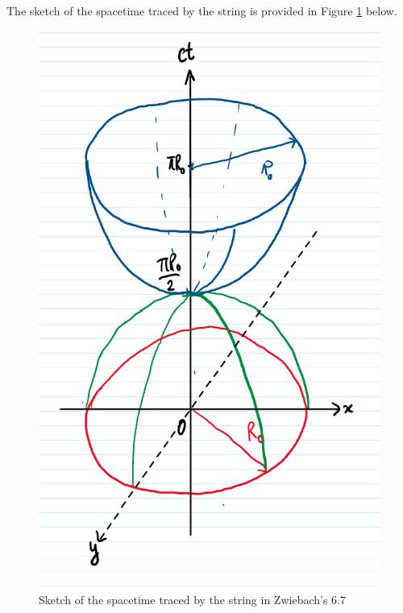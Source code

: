 \documentclass[11pt]{article}
\begin{document}
The sketch of the spacetime traced by the string is provided in Figure \ref{fig: q6_7sol} below. 
\begin{figure}
    \centering
    \includegraphics[height=0.7\textheight]{images/sketch6_7zwiebach.png}
    \caption{Sketch of the spacetime traced by the string in Zwiebach's 6.7}
    \label{fig: q6_7sol}
\end{figure}

\clearpage  
\end{document}
